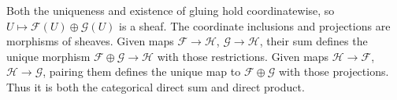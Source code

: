 Both the uniqueness and existence of gluing hold coordinatewise, so $U\mapsto\mathscr F(U)\oplus\mathscr G(U)$ is a sheaf. The coordinate inclusions and projections are morphisms of sheaves. Given maps $\mathscr F\to\mathscr H$, $\mathscr G\to\mathscr H$, their sum defines the unique morphism $\mathscr F\oplus\mathscr G\to\mathscr H$ with those restrictions. Given maps $\mathscr H\to\mathscr F$, $\mathscr H\to\mathscr G$, pairing them defines the unique map to $\mathscr F\oplus\mathscr G$ with those projections. Thus it is both the categorical direct sum and direct product.
